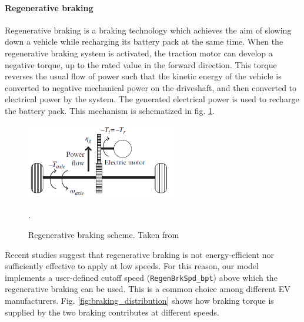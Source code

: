 \paragraph{Regenerative braking}
Regenerative braking is a braking technology which achieves the aim of slowing down a vehicle while recharging its battery pack at the same time.
When the regenerative braking system is activated, the traction motor can develop a negative torque, up to the rated value in the forward direction. This torque reverses the usual flow of power such that the kinetic energy of the vehicle is converted to negative mechanical power on the driveshaft, and then converted to electrical power by the system. The generated electrical power is used to recharge the battery pack. This mechanism is schematized in fig. \ref{fig:regen_braking}.

\begin{figure}[htb]
    \centering
    \includegraphics[width=0.6\textwidth]{images/regen_braking}
    \caption[Regenerative braking]{Regenerative braking scheme. Taken from \cite{hayes_ev_book}}.
    \label{fig:regen_braking}
\end{figure}

Recent studies \cite{regen_braking_limitations, wiki:regen_braking} suggest that regenerative braking is not energy-efficient nor sufficiently effective to apply at low speeds. For this reason, our model implements a user-defined cutoff speed (\texttt{RegenBrkSpd\_bpt}) above which the regenerative braking can be used. This is a common choice among different EV manufacturers. Fig. \ref{fig:braking_distribution} shows how braking torque is supplied by the two braking contributes at different speeds.

